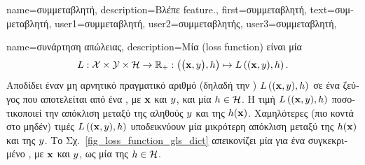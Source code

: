 {name={\foreignlanguage{greek}{συμμεταβλητή}},
	description={\foreignlanguage{greek}{Βλέπε} \gls{feature}.}, 
	first={\foreignlanguage{greek}{συμμεταβλητή}},
	text={\foreignlanguage{greek}{συμμεταβλητή}},
	user1={\foreignlanguage{greek}{συμμεταβλητή}}, %
	user2={\foreignlanguage{greek}{συμμεταβλητής}}, %
	user3={\foreignlanguage{greek}{συμμεταβλητή}}, %
}

{name={\foreignlanguage{greek}{συνάρτηση απώλειας}}, 
	description={\foreignlanguage{greek}{Μία}   
		(loss function) \foreignlanguage{greek}{είναι μία}  
		$$L: \mathcal{X} \times \mathcal{Y} \times \mathcal{H} \rightarrow \mathbb{R}_{+}: \big( \big({\bf x},y\big),
		 h\big) \mapsto  L\left(({\bf x},y),h \right).$$
		\foreignlanguage{greek}{Αποδίδει έναν μη αρνητικό πραγματικό αριθμό (δηλαδή την} )\linebreak 
		$L\left(({\bf x},y),h \right)$ \foreignlanguage{greek}{σε ένα ζεύγος που αποτελείται από ένα} , 
		\foreignlanguage{greek}{με}  ${\bf x}$ \foreignlanguage{greek}{και}  $y$, 
		\foreignlanguage{greek}{και μία}  $h \in \mathcal{H}$. \foreignlanguage{greek}{Η τιμή  
		$L\left(({\bf x},y),h \right)$ ποσοτικοποιεί την απόκλιση μεταξύ της αληθούς}  $y$ 
		\foreignlanguage{greek}{και της}  $h({\bf x})$. \foreignlanguage{greek}{Χαμηλότερες (πιο κοντά 
		στο μηδέν) τιμές $L\left(({\bf x},y),h \right)$ υποδεικνύουν μία μικρότερη απόκλιση μεταξύ της}  
		 $h({\bf x})$ \foreignlanguage{greek}{και της}  $y$. 
		\foreignlanguage{greek}{Το Σχ.}\ \ref{fig_loss_function_gls_dict} \foreignlanguage{greek}{απεικονίζει μία}  
		 \foreignlanguage{greek}{για ένα συγκεκριμένο} , \foreignlanguage{greek}{με} 
		 ${\bf x}$ \foreignlanguage{greek}{και}  $y$, \foreignlanguage{greek}{ως μία} 
		 \foreignlanguage{greek}{της}  $h \in \mathcal{H}$. 
}}
